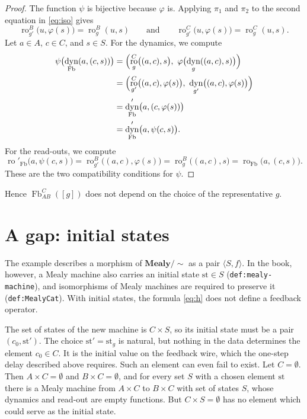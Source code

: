 \documentclass[11pt,a4paper]{article}
\theoremstyle{plain}
\theoremstyle{remark}
\DeclareMathOperator{\dyn}{dyn}
\DeclareMathOperator{\ro}{ro}
\DeclareMathOperator{\Fb}{Fb}
\newcommand{\st}{\mathrm{st}}
\newcommand{\MealyMod}{\mathbf{Mealy}/{\sim}}
\newcommand{\lbl}[1]{\nolinkurl{#1}}
\begin{document}
\begin{proof}
    The function $\psi$ is bijective because $\varphi$ is.
    Applying $\pi_1$ and $\pi_2$ to the second equation in \eqref{eq:iso} gives
    \begin{equation*}
        \ro_{g'}^{B}\bigl(u, \varphi(s)\bigr) = \ro_g^{B}(u, s)
        \qquad \text{and} \qquad
        \ro_{g'}^{C}\bigl(u, \varphi(s)\bigr) = \ro_g^{C}(u, s).
    \end{equation*}
    Let $a \in A$, $c \in C$, and $s \in S$.
    For the dynamics, we compute
    \begin{align*}
        \psi\bigl(\dyn_{\Fb}(a, (c, s))\bigr)
         & = \Bigl(\ro_g^{C}\bigl((a, c), s\bigr),\ \varphi\bigl(\dyn_g((a, c), s)\bigr)\Bigr) \\
         & = \Bigl(\ro_{g'}^{C}\bigl((a, c), \varphi(s)\bigr),\ \dyn_{g'}\bigl((a, c), \varphi(s)\bigr)\Bigr) \\
         & = \dyn'_{\Fb}\bigl(a, (c, \varphi(s))\bigr) \\
         & = \dyn'_{\Fb}\bigl(a, \psi(c, s)\bigr).
    \end{align*}
    For the read-outs, we compute
    \begin{equation*}
        \ro'_{\Fb}\bigl(a, \psi(c, s)\bigr)
        = \ro_{g'}^{B}\bigl((a, c), \varphi(s)\bigr)
        = \ro_g^{B}\bigl((a, c), s\bigr)
        = \ro_{\Fb}\bigl(a, (c, s)\bigr).
    \end{equation*}
    These are the two compatibility conditions for $\psi$.
\end{proof}

Hence $\Fb_{A B}^{C}([g])$ does not depend on the choice of the representative $g$.

\section{A gap: initial states}
\label{sec:initial}

The example describes a morphism of $\MealyMod$ as a pair $\langle S, f \rangle$.
In the book, however, a Mealy machine also carries an initial state $\st \in S$ (\lbl{def:mealy-machine}), and isomorphisms of Mealy machines are required to preserve it (\lbl{def:MealyCat}).
With initial states, the formula \eqref{eq:h} does not define a feedback operator.

The set of states of the new machine is $C \times S$, so its initial state must be a pair $(c_0, \st')$.
The choice $\st' = \st_g$ is natural, but nothing in the data determines the element $c_0 \in C$.
It is the initial value on the feedback wire, which the one-step delay described above requires.
Such an element can even fail to exist.
Let $C = \emptyset$.
Then $A \times C = \emptyset$ and $B \times C = \emptyset$, and for every set $S$ with a chosen element $\st$ there is a Mealy machine from $A \times C$ to $B \times C$ with set of states $S$, whose dynamics and read-out are empty functions.
But $C \times S = \emptyset$ has no element which could serve as the initial state.
\end{document}
